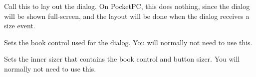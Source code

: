 
Call this to lay out the dialog. On PocketPC, this does nothing, since the dialog will be shown
full-screen, and the layout will be done when the dialog receives a size event.

\label{wxpropertysheetdialogsetbookctrl}


Sets the book control used for the dialog. You will normally not need to use this.

\label{wxpropertysheetdialogsetinnersizer}


Sets the inner sizer that contains the book control and button sizer. You will normally not need to use this.

